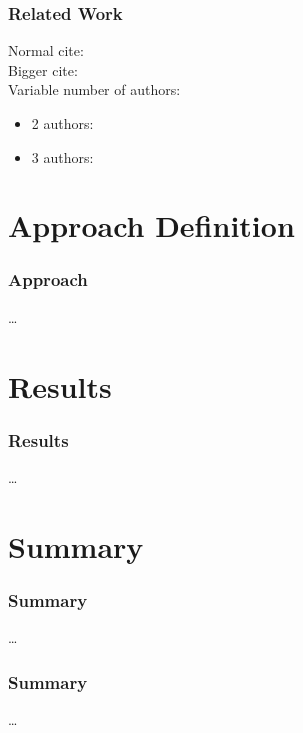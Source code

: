 \documentclass[noshadow]{ITRslides}
\begin{document}
\begin{frame}
	\frametitle{Related Work}
	Normal cite: \cite{molin2012optimality}\\
	Bigger cite: \\
	Variable number of authors: 
	\begin{itemize}
		\item 2 authors: 
		\item 3 authors: 
	\end{itemize}
\end{frame}

\section[Approach]{Approach Definition}
\begin{frame}
	\frametitle{Approach}
	\dots
\end{frame}

\section{Results}

\begin{frame}
	\frametitle{Results}
	\dots
\end{frame}

\section{Summary}

\begin{frame}
	\frametitle{Summary}
	\dots
\end{frame}

\begin{frame}
	\frametitle{Summary}
	\dots
\end{frame}
\end{document}
